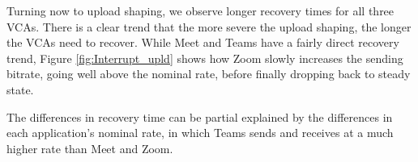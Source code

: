 Turning now to upload shaping, we observe longer recovery times for all three VCAs. There is a clear trend that the more severe the upload shaping, the longer the VCAs need to recover. While Meet and Teams have a fairly direct recovery trend, Figure \ref{fig:Interrupt_upld} shows how Zoom slowly increases the sending bitrate, going well above the nominal rate, before finally dropping back to steady state. 

The differences in recovery time can be partial explained by the differences in each application's nominal rate, in which Teams sends and receives at a much higher rate than Meet and Zoom. 








